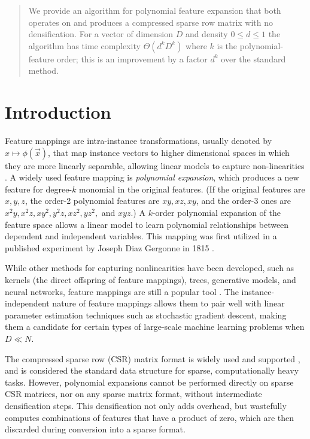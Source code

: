 \documentclass{article}
\begin{document}
\printAffiliationsAndNotice{\icmlEqualContribution} %

\begin{abstract}
We provide an algorithm for polynomial feature expansion that both operates on and produces a compressed sparse row matrix with no densification.
For a vector of dimension $D$ and density $0 \le d \le 1$ the algorithm has time complexity $\Theta(d^kD^k)$ where $k$ is the polynomial-feature order; this  is an improvement by a factor $d^k$ over the standard method.
\end{abstract}

\section{Introduction}

Feature mappings are intra-instance transformations, usually denoted by $x \mapsto \phi(\vec{x})$, that map instance vectors to higher dimensional spaces in which they are more linearly separable, allowing linear models to capture non-linearities \cite{yuan2012recent}.
A widely used feature mapping is \emph{polynomial expansion}, which produces a new feature for degree-$k$ monomial in the original features. (If the original features are $x,y,z$, the order-2 polynomial features are $xy, xz, xy$, and the order-3 ones are $x^2y, x^2z, xy^2, y^2 z, xz^2, yz^2,$ and $xyz$.)
A $k$-order polynomial expansion of the feature space allows a linear model to learn polynomial relationships between dependent and independent variables.
This mapping was first utilized in a published experiment by Joseph Diaz Gergonne in 1815 \cite{gergonne1974application, smith1918standard}.

While other methods for capturing nonlinearities have been developed, such as kernels (the direct offspring of feature mappings), trees, generative models, and neural networks, feature mappings are still a popular tool \cite{barker200114, chang2010training, shaw2006intellectual}.
The instance-independent nature of feature mappings allows them to pair well with linear parameter estimation techniques such as stochastic gradient descent, making them a candidate for certain types of large-scale machine learning problems when $D \ll N$.

The compressed sparse row (CSR) matrix format \cite{saad1994sparskit} is widely used \cite{liu2012sparse, bulucc2009parallel, bell2008efficient, white1997improving} and supported \cite{eigenweb, bastien2012theano, scikit-learn, koenker2003sparsem}, and is considered the standard data structure for sparse, computationally heavy tasks.
However, polynomial expansions cannot be performed directly on sparse CSR matrices, nor on any sparse matrix format, without intermediate densification steps.
This densification not only adds overhead, but wastefully computes combinations of features that have a product of zero, which are then discarded during conversion into a sparse format.
\end{document}
